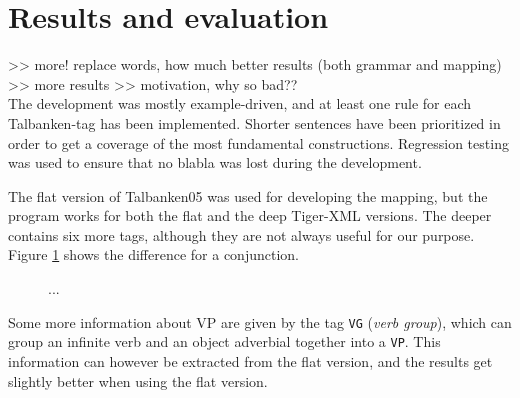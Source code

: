 \documentclass{report}
\begin{document}
\section{Results and evaluation}
>> more! replace words, how much better results (both grammar and mapping) 
>> more results
>> motivation, why so bad??\\
The development was mostly example-driven, and at least one rule for each
Talbanken-tag has been implemented.
Shorter sentences have been prioritized in order to get a coverage of the most
fundamental constructions. 
Regression testing was used to ensure that no blabla was lost during the development. %

The flat version of Talbanken05 was used for developing the mapping, but
the program works for both the flat and the deep Tiger-XML versions.
The deeper contains six more tags, although they are not always useful for our       
purpose. Figure \ref{fig:mappDeepFlat} shows the difference for a conjunction.
\begin{figure}[h]
\centering
{}
\caption{...}
\label{fig:mappDeepFlat}
\end{figure}

Some more information about VP are given by the tag \verb|VG| (\emph{verb group}),
which can group an infinite verb and an object adverbial together into a \verb|VP|.
This information can however be extracted from the flat version, and the results
get slightly better when using the flat version. \\
\end{document}
